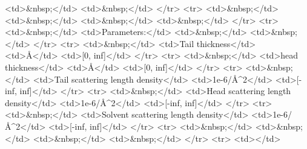 \textless{}td\textgreater{}\&nbsp;\textless{}/td\textgreater{} \textless{}td\textgreater{}\&nbsp;\textless{}/td\textgreater{} \textless{}/tr\textgreater{} \textless{}tr\textgreater{} \textless{}td\textgreater{}\&nbsp;\textless{}/td\textgreater{} \textless{}td\textgreater{}\&nbsp;\textless{}/td\textgreater{} \textless{}td\textgreater{}\&nbsp;\textless{}/td\textgreater{} \textless{}td\textgreater{}\&nbsp;\textless{}/td\textgreater{} \textless{}/tr\textgreater{} \textless{}tr\textgreater{} \textless{}td\textgreater{}\&nbsp;\textless{}/td\textgreater{} \textless{}td\textgreater{}Parameters:\textless{}/td\textgreater{} \textless{}td\textgreater{}\&nbsp;\textless{}/td\textgreater{} \textless{}td\textgreater{}\&nbsp;\textless{}/td\textgreater{} \textless{}/tr\textgreater{} \textless{}tr\textgreater{} \textless{}td\textgreater{}\&nbsp;\textless{}/td\textgreater{} \textless{}td\textgreater{}Tail thickness\textless{}/td\textgreater{} \textless{}td\textgreater{}\AA{}\textless{}/td\textgreater{} \textless{}td\textgreater{}[0, inf]\textless{}/td\textgreater{} \textless{}/tr\textgreater{} \textless{}tr\textgreater{} \textless{}td\textgreater{}\&nbsp;\textless{}/td\textgreater{} \textless{}td\textgreater{}head thickness\textless{}/td\textgreater{} \textless{}td\textgreater{}\AA{}\textless{}/td\textgreater{} \textless{}td\textgreater{}[0, inf]\textless{}/td\textgreater{} \textless{}/tr\textgreater{} \textless{}tr\textgreater{} \textless{}td\textgreater{}\&nbsp;\textless{}/td\textgreater{} \textless{}td\textgreater{}Tail scattering length density\textless{}/td\textgreater{} \textless{}td\textgreater{}1e-6/\AA{}\textasciicircum{}2\textless{}/td\textgreater{} \textless{}td\textgreater{}[-inf, inf]\textless{}/td\textgreater{} \textless{}/tr\textgreater{} \textless{}tr\textgreater{} \textless{}td\textgreater{}\&nbsp;\textless{}/td\textgreater{} \textless{}td\textgreater{}Head scattering length density\textless{}/td\textgreater{} \textless{}td\textgreater{}1e-6/\AA{}\textasciicircum{}2\textless{}/td\textgreater{} \textless{}td\textgreater{}[-inf, inf]\textless{}/td\textgreater{} \textless{}/tr\textgreater{} \textless{}tr\textgreater{} \textless{}td\textgreater{}\&nbsp;\textless{}/td\textgreater{} \textless{}td\textgreater{}Solvent scattering length density\textless{}/td\textgreater{} \textless{}td\textgreater{}1e-6/\AA{}\textasciicircum{}2\textless{}/td\textgreater{} \textless{}td\textgreater{}[-inf, inf]\textless{}/td\textgreater{} \textless{}/tr\textgreater{} \textless{}tr\textgreater{} \textless{}td\textgreater{}\&nbsp;\textless{}/td\textgreater{} \textless{}td\textgreater{}\&nbsp;\textless{}/td\textgreater{} \textless{}td\textgreater{}\&nbsp;\textless{}/td\textgreater{} \textless{}td\textgreater{}\&nbsp;\textless{}/td\textgreater{} \textless{}/tr\textgreater{} \textless{}tr\textgreater{} \textless{}td\textgreater{}\textless{}/td\textgreater{}

